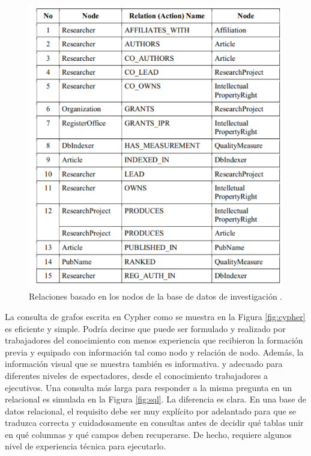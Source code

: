 \begin{figure}[H]
    \centering
    \includegraphics[scale=0.7]{Graficos/relaciones.png}
    \caption{Relaciones basado en los nodos de la base de datos de investigación \cite{afandi2020university}.}
    \label{fig:tab_2}
\end{figure}
La consulta de grafos escrita en Cypher como se muestra en la Figura \ref{fig:cypher}  es eficiente y simple. Podría decirse que puede ser formulado y realizado por trabajadores del conocimiento con menos experiencia que recibieron la formación previa y equipado con información tal como nodo y relación de nodo.
Además, la información visual que se muestra también es informativa.
y adecuado para diferentes niveles de espectadores, desde el conocimiento
trabajadores a ejecutivos.
 Una consulta más larga para responder a la misma pregunta en un relacional
es simulada en la Figura \ref{fig:sql}. La diferencia es clara. En
una base de datos relacional, el requisito debe ser muy explícito
por adelantado para que se traduzca correcta y cuidadosamente en consultas
antes de decidir qué tablas unir en qué columnas y
qué campos deben recuperarse. De hecho, requiere algunos
nivel de experiencia técnica para ejecutarlo.

